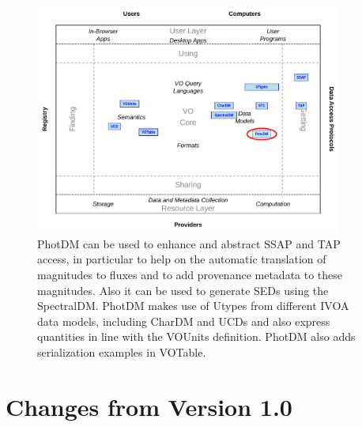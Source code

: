 \documentclass[11pt,a4paper]{ivoa}
\begin{document}
\begin{figure}[H] 
\centering


\includegraphics[width=0.9\textwidth]{role_diagram.pdf}
\caption{PhotDM can be used to enhance and abstract SSAP and TAP access, in particular 
to help on the automatic translation of magnitudes to fluxes and to add provenance 
metadata to these magnitudes. Also it can be used to generate SEDs using the SpectralDM.
PhotDM makes use of Utypes from different IVOA data models, including CharDM and UCDs and
also express quantities in line with the VOUnits definition.
PhotDM also adds serialization examples in VOTable.
}
\label{fig:archdiag}
\end{figure}

\section*{Changes from Version 1.0} \label{changesTable}

\end{document}
